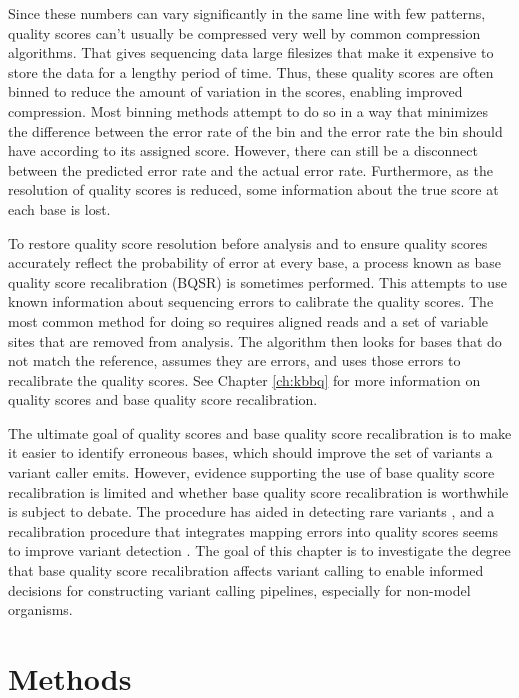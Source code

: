 Since these numbers can vary significantly in the same line with few patterns, quality scores can't usually be compressed very well by common compression algorithms. That gives sequencing data large filesizes that make it expensive to store the data for a lengthy period of time. Thus, these quality scores are often binned to reduce the amount of variation in the scores, enabling improved compression. Most binning methods attempt to do so in a way that minimizes the difference between the error rate of the bin and the error rate the bin should have according to its assigned score. However, there can still be a disconnect between the predicted error rate and the actual error rate. Furthermore, as the resolution of quality scores is reduced, some information about the true score at each base is lost.

To restore quality score resolution before analysis and to ensure quality scores accurately reflect the probability of error at every base, a process known as base quality score recalibration (BQSR) is sometimes performed. This attempts to use known information about sequencing errors to calibrate the quality scores. The most common method for doing so requires aligned reads and a set of variable sites that are removed from analysis. The algorithm then looks for bases that do not match the reference, assumes they are errors, and uses those errors to recalibrate the quality scores. See Chapter \ref{ch:kbbq} for more information on quality scores and base quality score recalibration.
	
The ultimate goal of quality scores and base quality score recalibration is to make it easier to identify erroneous bases, which should improve the set of variants a variant caller emits. However, evidence supporting the use of base quality score recalibration is limited and whether base quality score recalibration is worthwhile is subject to debate. The procedure has aided in detecting rare variants \parencite{ni_improvement_2016}, and a recalibration procedure that integrates mapping errors into quality scores seems to improve variant detection \parencite{li_improving_2011}. The goal of this chapter is to investigate the degree that base quality score recalibration affects variant calling to enable informed decisions for constructing variant calling pipelines, especially for non-model organisms.

\section{Methods}

